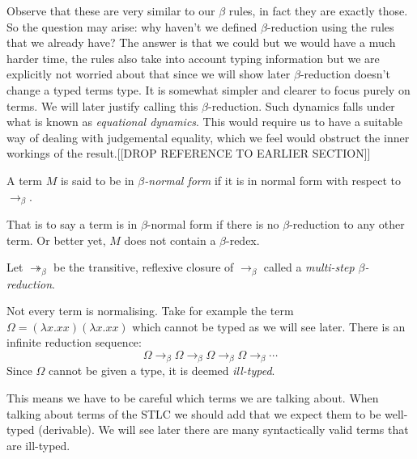 \begin{remark}
    Observe that these are very similar to our $\beta$ rules, in fact they are exactly those. So the question may arise: why haven't we defined $\beta$-reduction using the rules that we already have? The answer is that we could but we would have a much harder time, the rules also take into account typing information but we are explicitly not worried about that since we will show later $\beta$-reduction doesn't change a typed terms type. It is somewhat simpler and clearer to focus purely on terms. We will later justify calling this $\beta$-reduction.
    Such dynamics falls under what is known as \emph{equational dynamics}. This would require us to have a suitable way of dealing with judgemental equality, which we feel would obstruct the inner workings of the result.[[DROP REFERENCE TO EARLIER SECTION]]
\end{remark}

\begin{defin}
    A term $M$ is said to be in \emph{$\beta$-normal form} if it is in normal form with respect to $\to_\beta$.
\end{defin}

\begin{remark}
    That is to say a term is in $\beta$-normal form if there is no $\beta$-reduction to any other term. Or better yet, $M$ does not contain a $\beta$-redex.
\end{remark}

\begin{defin}
    Let $\twoheadrightarrow_{\beta}$ be the transitive, reflexive closure of $\to_{\beta}$ called a \emph{multi-step $\beta$-reduction}.
\end{defin}

\begin{remark}\label{beta_non_normalising_remark}
    Not every term is normalising. Take for example the term $\Omega=(\lambda x . x x)(\lambda x . x x)$ which cannot be typed as we will see later. There is an infinite reduction sequence:
    $$
        \Omega \to_{\beta} \Omega \to_{\beta} \Omega \to_{\beta} \Omega \to_{\beta} \cdots
    $$
    Since $\Omega$ cannot be given a type, it is deemed \emph{ill-typed}.
\end{remark}

This means we have to be careful which terms we are talking about. When talking about terms of the STLC we should add that we expect them to be well-typed (derivable). We will see later there are many syntactically valid terms that are ill-typed.


